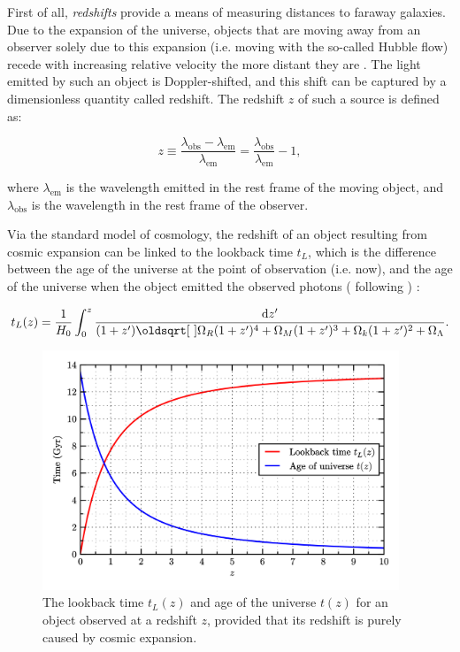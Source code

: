 First of all, \textit{redshifts} provide a means of measuring distances to faraway galaxies. Due to the expansion of the universe, objects that are moving away from an observer solely due to this expansion (i.e. moving with the so-called Hubble flow) recede with increasing relative velocity the more distant they are \citep{1929PNAS...15..168H}. The light emitted by such an object is Doppler-shifted, and this shift can be captured by a dimensionless quantity called redshift. The redshift $z$ of such a source is defined as:

\begin{equation}
    z \equiv \frac{\lambda_{\mathrm{obs}}-\lambda_{\mathrm{em}}}{\lambda_{\mathrm{em}}} = \frac{\lambda_{\mathrm{obs}}}{\lambda_{\mathrm{em}}}-1, \label{eqn:redshift_definition}
\end{equation}

\noindent where $\lambda_{\mathrm{em}}$ is the wavelength emitted in the rest frame of the moving object, and $\lambda_{\mathrm{obs}}$ is the wavelength in the rest frame of the observer.  \par


Via the standard model of cosmology, the redshift of an object resulting from cosmic expansion can be linked to the lookback time $t_L$, which is the difference between the age of the universe at the point of observation (i.e. now), and the age of the universe when the object emitted the observed photons (\citealt{1999astro.ph..5116H} following \citealt{1993ppc..book.....P}) : 

\begin{equation}
    t_L(z)= \frac{1}{H_{0}} \int_{0}^{z} \frac{ \diff z'}{(1+z')\sqrt{\Omega_{R}(1+z')^4+\Omega_{M}(1+z')^3+\Omega_{k}(1+z')^2+\Omega_{\Lambda}}}.\label{eqn:lookback_time}
\end{equation}


\begin{figure}[t] 
\centering    
\includegraphics[width=0.95\textwidth]{Chapter1/Figs/lookback_time.png}
\caption[Relation between redshift and cosmic time]{The lookback time $t_L(z)$ and age of the universe $t(z)$ for an object observed at a redshift $z$, provided that its redshift is purely caused by cosmic expansion.} 
\label{fig:lookback_time}
\end{figure}

